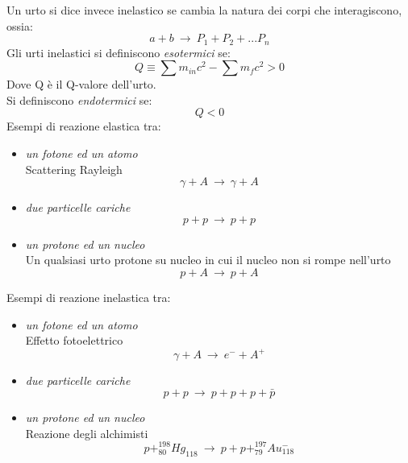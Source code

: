 \documentclass[twoside]{article}
\begin{document}
Un urto si dice invece inelastico se cambia la natura dei corpi che interagiscono, ossia:
\begin{equation}
    a+b \ \rightarrow \ P_1+P_2+...P_n
\end{equation}
Gli urti inelastici si definiscono \textit{esotermici} se:
\begin{equation}
    Q\equiv \sum m_{in}c^2-\sum m_f c^2 > 0
\end{equation}
Dove Q è il Q-valore dell'urto.\\
Si definiscono \textit{endotermici} se:
\begin{equation}
    Q<0
\end{equation}
Esempi di reazione elastica tra:
\begin{itemize}
    \item \textit{un fotone ed un atomo} \\
    Scattering Rayleigh
    \begin{equation}
        \gamma + A \ \rightarrow \ \gamma + A
    \end{equation}
    \item\textit{due particelle cariche}
    \begin{equation}
        p + p \ \rightarrow \ p + p
    \end{equation}
    \item\textit{un protone ed un nucleo}\\
    Un qualsiasi urto protone su nucleo in cui il nucleo non si rompe nell'urto
    \begin{equation}
        p + A \ \to \ p+A
    \end{equation}
\end{itemize}

Esempi di reazione inelastica tra:
\begin{itemize}
    \item \textit{un fotone ed un atomo} \\
    Effetto fotoelettrico 
    \begin{equation}
        \gamma + A \ \rightarrow \ e^- + A^+
    \end{equation}
    \item\textit{due particelle cariche}
    \begin{equation}
        p+p \ \rightarrow \ p+p+p+\bar{p}
    \end{equation}
    \item\textit{un protone ed un nucleo} \\
    Reazione degli alchimisti
    \begin{equation}
        p+ ^{198}_{80}Hg_{118} \ \rightarrow \ p+p+^{197}_{79}Au^- _{118}
    \end{equation}
\end{itemize}
\end{document}
